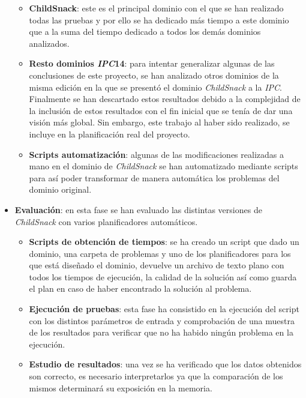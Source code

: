\documentclass{article}
\begin{document}
\begin{itemize}
        \begin{itemize}
            \item \textbf{ChildSnack}: este es el principal dominio con el que se han realizado todas las pruebas y por ello se ha dedicado más tiempo a este dominio que a la suma del tiempo dedicado a todos los demás dominios analizados.
            \item \textbf{Resto dominios \textit{IPC}14}: para intentar generalizar algunas de las conclusiones de este proyecto, se han analizado otros dominios de la misma edición en la que se presentó el dominio \textit{ChildSnack} a la \textit{IPC}. Finalmente se han descartado estos resultados debido a la complejidad de la inclusión de estos resultados con el fin inicial que se tenía de dar una visión más global. Sin embargo, este trabajo al haber sido realizado, se incluye en la planificación real del proyecto.
            \item \textbf{Scripts automatización}: algunas de las modificaciones realizadas a mano en el dominio de \textit{ChildSnack} se han automatizado mediante scripts para así poder transformar de manera automática los problemas del dominio original.
        \end{itemize}
        
        \item \textbf{Evaluación}: en esta fase se han evaluado las distintas versiones de \textit{ChildSnack} con varios planificadores automáticos.
        
        \begin{itemize}
            \item \textbf{Scripts de obtención de tiempos}: se ha creado un script que dado un dominio, una carpeta de problemas y uno de los planificadores para los que está diseñado el dominio, devuelve un archivo de texto plano con todos los tiempos de ejecución, la calidad de la solución así como guarda el plan en caso de haber encontrado la solución al problema.
            \item \textbf{Ejecución de pruebas}: esta fase ha consistido en la ejecución del script con los distintos parámetros de entrada y comprobación de una muestra de los resultados para verificar que no ha habido ningún problema en la ejecución.
            \item \textbf{Estudio de resultados}: una vez se ha verificado que los datos obtenidos son correcto, es necesario interpretarlos ya que la comparación de los mismos determinará su exposición en la memoria.
        \end{itemize}
        

\end{itemize}
\end{document}
